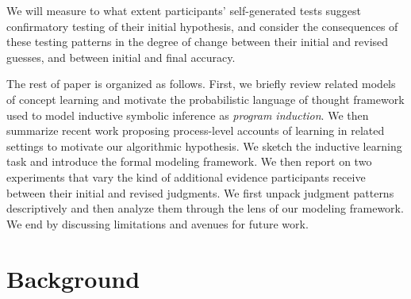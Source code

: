 \documentclass[doc,natbib,floatsintext]{apa7}
\begin{document}
We will measure to what extent participants' self-generated tests suggest confirmatory testing of their initial hypothesis, and consider the consequences of these testing patterns in the degree of change between their initial and revised guesses, and between initial and final accuracy.

The rest of paper is organized as follows. First, we briefly review related models of concept learning and motivate the probabilistic language of thought framework used to model inductive symbolic inference as \textit{program induction}. We then summarize recent work proposing process-level accounts of learning in related settings to motivate our algorithmic hypothesis. We sketch the inductive learning task and introduce the formal modeling framework. We then report on two experiments that vary the kind of additional evidence participants receive between their initial and revised judgments. We first unpack judgment patterns descriptively and then analyze them through the lens of our modeling framework. We end by discussing limitations and avenues for future work.

\section{Background}
\end{document}
